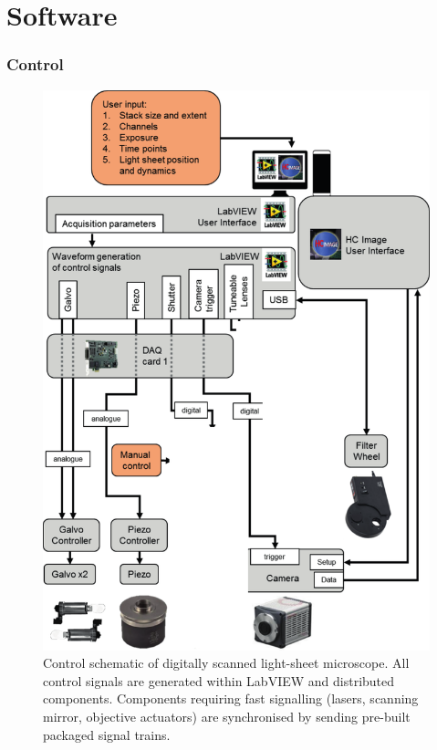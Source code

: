 
\section{Software}

\subsubsection{Control}

\begin{figure}
  \includegraphics{./control} %
  \caption{Control schematic of digitally scanned light-sheet microscope. All control signals are generated within LabVIEW and distributed components. Components requiring fast signalling (lasers, scanning mirror, objective actuators) are synchronised by sending pre-built packaged signal trains.}
  \label{fig:control}
\end{figure}

